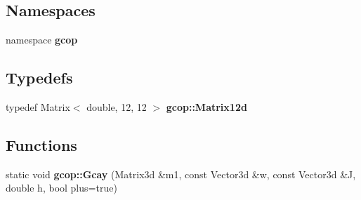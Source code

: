 \subsection*{\-Namespaces}
\begin{DoxyCompactItemize}
\item 
namespace {\bf gcop}
\end{DoxyCompactItemize}
\subsection*{\-Typedefs}
\begin{DoxyCompactItemize}
\item 
typedef \-Matrix$<$ double, 12, 12 $>$ {\bf gcop\-::\-Matrix12d}
\end{DoxyCompactItemize}
\subsection*{\-Functions}
\begin{DoxyCompactItemize}
\item 
static void {\bf gcop\-::\-Gcay} (\-Matrix3d \&m1, const \-Vector3d \&w, const \-Vector3d \&\-J, double h, bool plus=true)
\end{DoxyCompactItemize}
